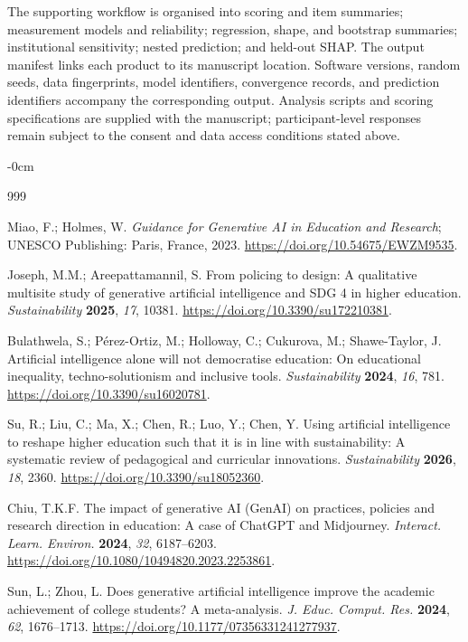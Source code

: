 \documentclass[sustainability,article,accept,moreauthors]{Definitions/mdpi}
\begin{document}
The supporting workflow is organised into scoring and item summaries; measurement models and reliability; regression, shape, and bootstrap summaries; institutional sensitivity; nested prediction; and held-out SHAP. The output manifest links each product to its manuscript location. Software versions, random seeds, data fingerprints, model identifiers, convergence records, and prediction identifiers accompany the corresponding output. Analysis scripts and scoring specifications are supplied with the manuscript; participant-level responses remain subject to the consent and data access conditions stated above.


\begin{adjustwidth}{-\extralength}{0cm}


\begin{thebibliography}{999}


Miao, F.; Holmes, W. \textit{Guidance for Generative AI in Education and Research}; UNESCO Publishing: Paris, France, 2023. \url{https://doi.org/10.54675/EWZM9535}.

Joseph, M.M.; Areepattamannil, S. From policing to design: A qualitative multisite study of generative artificial intelligence and SDG 4 in higher education. \textit{Sustainability} \textbf{2025}, \textit{17}, 10381. \url{https://doi.org/10.3390/su172210381}.

Bulathwela, S.; P{\'e}rez-Ortiz, M.; Holloway, C.; Cukurova, M.; Shawe-Taylor, J. Artificial intelligence alone will not democratise education: On educational inequality, techno-solutionism and inclusive tools. \textit{Sustainability} \textbf{2024}, \textit{16}, 781. \url{https://doi.org/10.3390/su16020781}.

Su, R.; Liu, C.; Ma, X.; Chen, R.; Luo, Y.; Chen, Y. Using artificial intelligence to reshape higher education such that it is in line with sustainability: A systematic review of pedagogical and curricular innovations. \textit{Sustainability} \textbf{2026}, \textit{18}, 2360. \url{https://doi.org/10.3390/su18052360}.

Chiu, T.K.F. The impact of generative AI (GenAI) on practices, policies and research direction in education: A case of ChatGPT and Midjourney. \textit{Interact. Learn. Environ.} \textbf{2024}, \textit{32}, 6187--6203. \url{https://doi.org/10.1080/10494820.2023.2253861}.

Sun, L.; Zhou, L. Does generative artificial intelligence improve the academic achievement of college students? A meta-analysis. \textit{J. Educ. Comput. Res.} \textbf{2024}, \textit{62}, 1676--1713. \url{https://doi.org/10.1177/07356331241277937}.


\end{thebibliography}
\end{adjustwidth}
\end{document}
